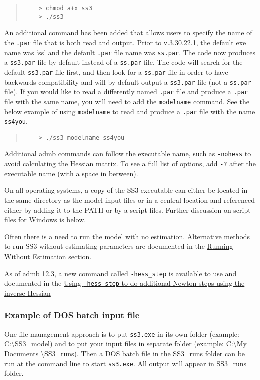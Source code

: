 \begin{quote}
	\begin{verbatim}
	> chmod a+x ss3
	> ./ss3
	\end{verbatim}
\end{quote}

An additional command has been added that allows users to specify the name of the \texttt{.par} file that is both read and output. Prior to v.3.30.22.1, the default exe name was `ss' and the default \texttt{.par} file name was \texttt{ss.par}. The code now produces a \texttt{ss3.par} file by default instead of a \texttt{ss.par} file. The code will search for the default \texttt{ss3.par} file first, and then look for a \texttt{ss.par} file in order to have backwards compatibility and will by default output a \texttt{ss3.par} file (not a \texttt{ss.par} file). If you would like to read a differently named \texttt{.par} file and produce a \texttt{.par} file with the same name, you will need to add the \texttt{modelname} command. See the below example of using \texttt{modelname} to read and produce a \texttt{.par} file with the name \texttt{ss4you}.

\begin{quote}
	\begin{verbatim}
	> ./ss3 modelname ss4you
	\end{verbatim}
\end{quote}

Additional \gls{admb} commands can follow the executable name, such as \texttt{-nohess} to avoid calculating the Hessian matrix. To see a full list of options, add \texttt{-?} after the executable name (with a space in between).

On all operating systems, a copy of the SS3 executable can either be located in the same directory as the model input files or in a central location and referenced either by adding it to the PATH or by a script files. Further discussion on script files for Windows is below.

Often there is a need to run the model with no estimation. Alternative methods to run SS3 without estimating parameters are documented in the \hyperlink{NoEst}{Running Without Estimation section}. 

As of \gls{admb} 12.3, a new command called \texttt{-hess\_step} is available to use and documented in the \hyperlink{hess-step}{Using \texttt{-hess\_step} to do additional Newton steps using the inverse Hessian}

\hypertarget{DOS}{}
\subsubsection[Example of DOS batch input file]{\protect\hyperlink{DOS}{Example of DOS batch input file}}
One file management approach is to put \texttt{ss3.exe} in its own folder (example:  C:\textbackslash SS3\_model) and to put your input files in separate folder (example:  C:\textbackslash My Documents \textbackslash SS3\_runs). Then a DOS batch file in the SS3\_runs folder can be run at the command line to start \texttt{ss3.exe}. All output will appear in SS3\_runs folder.

